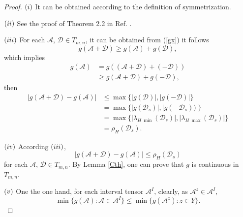 \documentclass[twoside]{article}
\begin{document}
\begin{proof} $(\romannumeral1)$ It can be obtained according to the definition of symmetrization.

$(\romannumeral2)$ See the proof of Theorem 2.2 in Ref. \cite{ql2017}.

$(\romannumeral3)$ For each $\mathcal{A}$, $\mathcal{D}\in T_{m,n}$, it can be obtained from (\ref{gx}) it follows
$$g(\mathcal{A}+\mathcal{D})\geq g(\mathcal{A})+g(\mathcal{D}),$$
which implies
\begin{align*}
g(\mathcal{A}) & =g((\mathcal{A}+\mathcal{D}) + (-\mathcal{D})) \\
   & \geq g(\mathcal{A}+\mathcal{D}) + g(-\mathcal{D}),
\end{align*}
then
\begin{align*}
|g(\mathcal{A}+\mathcal{D})-g(\mathcal{A})| &\leq \max \{|g(\mathcal{D})|, |g(-\mathcal{D})| \}\\
&=\max \{|g(\mathcal{D}_s)|, |g(-\mathcal{D}_s))|\}\\
&=\max \{|\lambda_{H~\min}(\mathcal{D}_s)|, |\lambda_{H~\max}(\mathcal{D}_s)|\}\\
&=\rho_H(\mathcal{D}_s).
\end{align*}

$(\romannumeral4)$ According $(\romannumeral3)$,
$$|g(\mathcal{A}+\mathcal{D})-g(\mathcal{A})| \leq\rho_H(\mathcal{D}_s)$$
for each $\mathcal{A}$, $\mathcal{D}\in T_{m,n}$. By Lemma \ref{Cth}, one can prove that $g$ is continuous in $T_{m,n}$.



$(\romannumeral5)$ One the one hand, for each interval tensor $\mathcal{A}^I$, clearly, as $\mathcal{A}^z\in\mathcal{A}^I$,
$$\min\{g(\mathcal{A}):\mathcal{A}\in\mathcal{A}^I\}\leq \min\{g(\mathcal{A}^z):z\in Y\}.$$



\end{proof}
\end{document}
